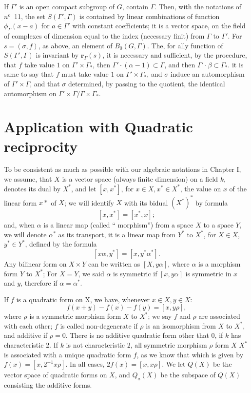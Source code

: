 \documentclass[12pt]{amsart}
\def\br{{\mathbf{r}}}
\newcounter{ssection}
\renewcommand{\subsection}{
  \addtocounter{ssection}{1}{\bf  \arabic{ssection}.\  }}
\begin{document}
If $\Gamma'$ is an open compact subgroup of $G$, contain $\Gamma$.
Then, with the notations of $n^o$~11,
the set $S(\Gamma', \Gamma)$ is contained by linear combinations of 
function $\phi_\Gamma(x-a)$ for $a\in \Gamma'$ with constant coefficients;
it is a vector space, on the field of complexes of dimension equal 
to the index (necessary finit) from $\Gamma$ to $\Gamma'$. 
For $s=(\sigma, f)$, as above, an element of $B_0(G,\Gamma)$. 
The, for ally function of $S(\Gamma', \Gamma)$ is invariant by $\br_\Gamma(s)$,
it is necessary and sufficient, by the procedure, that $f$ take value $1$ on 
$\Gamma'\times \Gamma_*$, then $\Gamma'\cdot (\alpha-1) \subset \Gamma$, 
and then $\Gamma'\cdot \beta \subset \Gamma_*$. it is same to say that 
$f$ must take value $1$ on $\Gamma'\times \Gamma_*$, and $\sigma$ induce 
an automorphism of $\Gamma'\times \Gamma$, and that $\sigma$ determined, 
by passing to the quotient, the identical automorphism on 
$\Gamma'\times \Gamma /\Gamma\times \Gamma_*$.

\setcounter{ssection}{22}

\section{Application  with Quadratic reciprocity}
\subsection{}
To be consistent as much as possible with our algebraic notations in Chapter I,
we assume, that $X$ is a vector space (always finite dimension) on a field $k$,
denotes its dual by $X^*$, and let  $[x, x^*]$, for $x\in X, x^* \in X^*$,
the value on $x$ of the linear form $x*$ of $X$;
we will identify $X$ with its bidual $(X^*)^*$ 
by  formula 
\[
[x, x^*] = [x^*, x];
\]
and, when $\alpha$ is a linear map (called `` morphism'') from a space $X$ 
to a space $Y$, we will denote $\alpha^*$ as its transport, 
it is a linear map from $Y^*$ to $X^*$, for $X \in X$, $y^* \in Y^*$, 
defined by the formula 
\[
[x\alpha, y^*] = [x, y^*\alpha^*].
\]
Any bilinear form on $X\times Y$ can be written as $[X, y\alpha]$,
where $\alpha$ is a morphism form $Y$ to $X^*$;
For $X=Y$, we said $\alpha$ is symmetric if $[x, y\alpha]$
 is symmetric in $x$ and $y$, therefore if $\alpha=\alpha^*$.

If $f$ is a quadratic form on X, we have, whenever $x \in X, y \in X$: 
\[
f (x + y) -f(x) - f (y) = [x, y\rho], 
\]
where $\rho$ is a symmetric morphism form $X$ to $X^*$; we 
say $f$ and $\rho$ are associated with each other;
$f$ is called non-degenerate if $\rho$ is an isomorphism from $X$ to  $X^*$,
 and additive if $\rho=0$.
There is no additive quadratic form other that $0$, if $k$ has characteristic  $2$. 
If $k$ is not characteristic 2,  all symmetric morphism $\rho$ form $X$ $X^*$
is associated with a unique quadratic form $f$,
as we know that which is given by $f(x) = [x, 2^{-1}x\rho]$.
In all cases,  $2f(x)= [x, x\rho]$. We let $Q(X)$ 
be the vector space of quadratic forms on $X$,
 and $Q_a(X)$ be the subspace of $Q(X)$ consisting the additive forms. 
\end{document}
